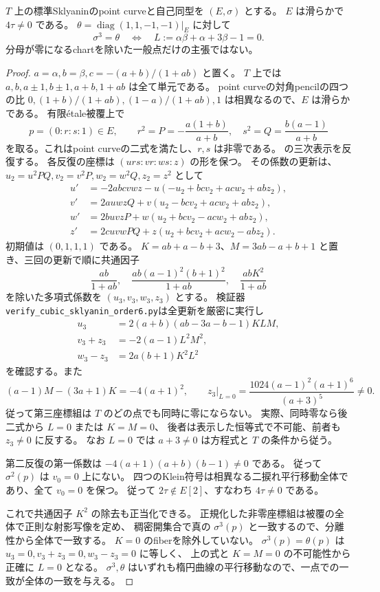 \begin{lemma}[指定二捩れへの三倍平行移動の完全方程式]
\label{lem:stafford-exact-order-six-locus}
$T$ 上の標準Sklyaninのpoint curveと自己同型を $(E,\sigma)$ とする。
$E$ は滑らかで $4\tau\ne0$ である。
$\theta=\operatorname{diag}(1,1,-1,-1)|_E$ に対して
\[
 \sigma^3=\theta\quad\Longleftrightarrow\quad
 L:=\alpha\beta+\alpha+3\beta-1=0.
\]
分母が零になるchartを除いた一般点だけの主張ではない。
\end{lemma}
\begin{proof}
$a=\alpha,b=\beta,c=-(a+b)/(1+ab)$ と置く。
$T$ 上では $a,b,a\pm1,b\pm1,a+b,1+ab$ は全て単元である。
point curveの対角pencilの四つの比
$0,(1+b)/(1+ab),(1-a)/(1+ab),1$ は相異なるので、$E$ は滑らかである。
有限\'etale被覆上で
\[
 p=(0:r:s:1)\in E,\qquad
 r^2=P=-\frac{a(1+b)}{a+b},\quad
 s^2=Q=\frac{b(a-1)}{a+b}
\]
を取る。これはpoint curveの二式を満たし、$r,s$ は非零である。
\cite[(2.5)]{WWYSklyanin4}の三次表示を反復する。
各反復の座標は $(u r s:v r:w s:z)$ の形を保つ。
その係数の更新は、$u_2=u^2PQ,v_2=v^2P,w_2=w^2Q,z_2=z^2$ として
\[
\begin{split}
 u'&=-2abc vwz-u(-u_2+bcv_2+acw_2+abz_2),\\
 v'&=2auwzQ+v(u_2-bcv_2+acw_2+abz_2),\\
 w'&=2buvzP+w(u_2+bcv_2-acw_2+abz_2),\\
 z'&=2cuvwPQ+z(u_2+bcv_2+acw_2-abz_2).
\end{split}
\]
初期値は $(0,1,1,1)$ である。
$K=ab+a-b+3$、$M=3ab-a+b+1$ と置き、三回の更新で順に共通因子
\[
 \frac{ab}{1+ab},\quad
 \frac{ab(a-1)^2(b+1)^2}{1+ab},\quad
 \frac{abK^2}{1+ab}
\]
を除いた多項式係数を $(u_3,v_3,w_3,z_3)$ とする。
検証器\texttt{verify\_cubic\_sklyanin\_order6.py}は全更新を厳密に実行し
\[
\begin{split}
 u_3&=2(a+b)(ab-3a-b-1)KLM,\\
 v_3+z_3&=-2(a-1)L^2M^2,\\
 w_3-z_3&=2a(b+1)K^2L^2
\end{split}
\]
を確認する。また
\[
 (a-1)M-(3a+1)K=-4(a+1)^2,
 \qquad z_3\big|_{L=0}=\frac{1024(a-1)^2(a+1)^6}{(a+3)^5}\ne0.
\]
従って第三座標組は $T$ のどの点でも同時に零にならない。
実際、同時零なら後二式から $L=0$ または $K=M=0$、
後者は表示した恒等式で不可能、前者も $z_3\ne0$ に反する。
なお $L=0$ では $a+3\ne0$ は方程式と $T$ の条件から従う。

第二反復の第一係数は $-4(a+1)(a+b)(b-1)\ne0$ である。
従って $\sigma^2(p)$ は $v_0=0$ 上にない。
四つのKlein符号は相異なる二捩れ平行移動全体であり、全て $v_0=0$ を保つ。
従って $2\tau\notin E[2]$、すなわち $4\tau\ne0$ である。

これで共通因子 $K^2$ の除去も正当化できる。
正規化した非零座標組は被覆の全体で正則な射影写像を定め、
稠密開集合で真の $\sigma^3(p)$ と一致するので、分離性から全体で一致する。
$K=0$ のfiberを除外していない。
$\sigma^3(p)=\theta(p)$ は
$u_3=0,v_3+z_3=0,w_3-z_3=0$ に等しく、
上の式と $K=M=0$ の不可能性から正確に $L=0$ となる。
$\sigma^3,\theta$ はいずれも楕円曲線の平行移動なので、一点での一致が全体の一致を与える。
\end{proof}


